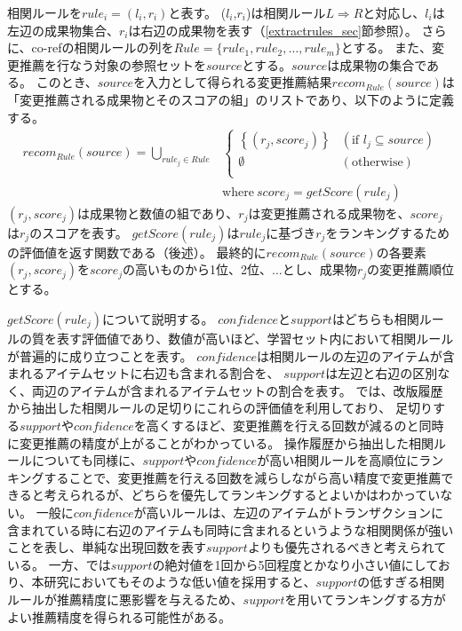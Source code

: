\documentclass[a4paper]{jsbook}
\def\Ra{\Rightarrow}
\newcommand{\confidence}{con\!f\!idence}
\newcommand{\getScore}{getS\!core}
\begin{document}
相関ルールを$rule_i = (l_i,r_i)$と表す。
($l_i$,$r_i$)は相関ルール$L \Ra R$と対応し、$l_i$は左辺の成果物集合、$r_i$は右辺の成果物を表す（\ref{extractrules_sec}節参照）。
さらに、co-refの相関ルールの列を$Rule = \{rule_1, rule_2, \dots, rule_m\}$とする。
また、変更推薦を行なう対象の参照セットを$source$とする。$source$は成果物の集合である。
このとき、$source$を入力として得られる変更推薦結果$recom_{Rule}(source)$は「変更推薦される成果物とそのスコアの組」のリストであり、以下のように定義する。
\begin{eqnarray}
  recom_{Rule}\left(source\right) = \bigcup_{rule_j \in Rule}
    &\left\{
    \begin{array}{ll}
      \left\{\left(r_j,score_j \right)\right\} &(\textrm{if~} l_j \subseteq source) \\
      \emptyset &(\textrm{otherwise})\\
    \end{array}
    \right.\\
    &\textrm{where}~score_j = \getScore(rule_j)\nonumber
\end{eqnarray}
$\left(r_j,score_j\right)$は成果物と数値の組であり、$r_j$は変更推薦される成果物を、$score_j$は$r_j$のスコアを表す。
$\getScore(rule_j)$は$rule_j$に基づき$r_j$をランキングするための評価値を返す関数である（後述）。
最終的に$recom_{Rule}(source)$の各要素$(r_j,score_j)$を$score_j$の高いものから1位、2位、$\dots$とし、成果物$r_j$の変更推薦順位とする。

$\getScore(rule_j)$について説明する。
$\confidence$と$support$はどちらも相関ルールの質を表す評価値であり、数値が高いほど、学習セット内において相関ルールが普遍的に成り立つことを表す。
$\confidence$は相関ルールの左辺のアイテムが含まれるアイテムセットに右辺も含まれる割合を、
$support$は左辺と右辺の区別なく、両辺のアイテムが含まれるアイテムセットの割合を表す。
\cite{Zimmermann:2005}では、改版履歴から抽出した相関ルールの足切りにこれらの評価値を利用しており、
足切りする$support$や$\confidence$を高くするほど、変更推薦を行える回数が減るのと同時に変更推薦の精度が上がることがわかっている。
操作履歴から抽出した相関ルールについても同様に、$support$や$\confidence$が高い相関ルールを高順位にランキングすることで、変更推薦を行える回数を減らしながら高い精度で変更推薦できると考えられるが、どちらを優先してランキングするとよいかはわかっていない。
一般に$\confidence$が高いルールは、左辺のアイテムがトランザクションに含まれている時に右辺のアイテムも同時に含まれるというような相関関係が強いことを表し、単純な出現回数を表す$support$よりも優先されるべきと考えられている。
一方、\cite{Zimmermann:2005}では$support$の絶対値を1回から5回程度とかなり小さい値にしており、本研究においてもそのような低い値を採用すると、$support$の低すぎる相関ルールが推薦精度に悪影響を与えるため、$support$を用いてランキングする方がよい推薦精度を得られる可能性がある。
\end{document}
